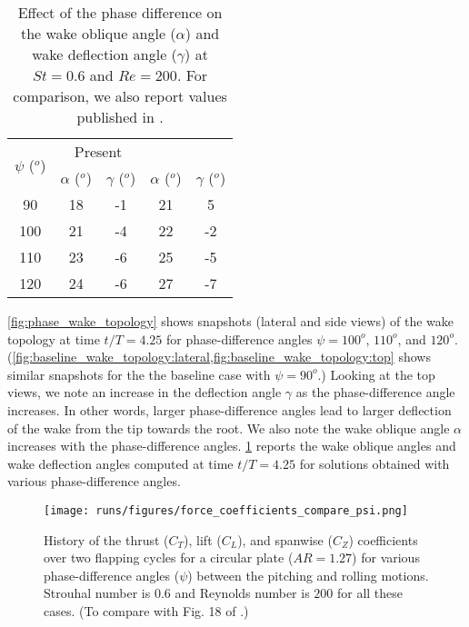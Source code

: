 \begin{table}
  \centering
  \begin{tabular}{ccccc}
    \hline\hline
    \multirow{2}{*}{$\psi$ ($^o$)} &
      \multicolumn{2}{c}{Present} &
      \multicolumn{2}{c}{\citet{li_dong_2016}} \\
    & $\alpha$ ($^o$) & $\gamma$ ($^o$) & $\alpha$ ($^o$) & $\gamma$ ($^o$) \\
    \hline
    90 & 18 & -1 & 21 & 5 \\
    100 & 21 & -4 & 22 & -2 \\
    110 & 23 & -6 & 25 & -5 \\
    120 & 24 & -6 & 27 & -7 \\
    \hline\hline
  \end{tabular}
  \caption{Effect of the phase difference on the wake oblique angle ($\alpha$) and wake deflection angle ($\gamma$) at $St = 0.6$ and $Re = 200$. For comparison, we also report values published in \citet{li_dong_2016}.}
  \label{tab:phase_angles}
\end{table}

\cref{fig:phase_wake_topology} shows snapshots (lateral and side views) of the wake topology at time $t/T = 4.25$ for phase-difference angles $\psi = 100^o$, $110^o$, and $120^o$.
(\cref{fig:baseline_wake_topology:lateral,fig:baseline_wake_topology:top} shows similar snapshots for the the baseline case with $\psi = 90^o$.)
Looking at the top views, we note an increase in the deflection angle $\gamma$ as the phase-difference angle increases.
In other words, larger phase-difference angles lead to larger deflection of the wake from the tip towards the root.
We also note the wake oblique angle $\alpha$ increases with the phase-difference angles.
\cref{tab:phase_angles} reports the wake oblique angles and wake deflection angles computed at time $t/T = 4.25$ for solutions obtained with various phase-difference angles.

\begin{figure}
  \centering
  \texttt{[image: runs/figures/force\_coefficients\_compare\_psi.png]}
  \caption{History of the thrust ($C_T$), lift ($C_L$), and spanwise ($C_Z$) coefficients over two flapping cycles for a circular plate ($AR = 1.27$) for various phase-difference angles ($\psi$) between the pitching and rolling motions. Strouhal number is $0.6$ and Reynolds number is $200$ for all these cases. (To compare with Fig. 18 of \citet{li_dong_2016}.)}
  \label{fig:phase_force_coefficients}
\end{figure}

